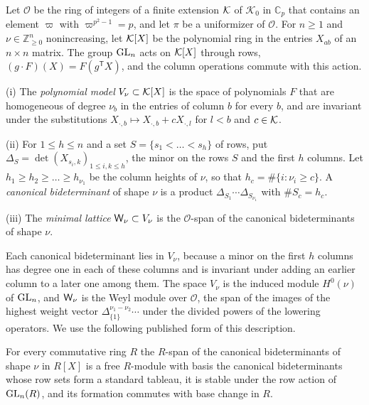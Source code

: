 Let $\mathcal O$ be the ring of integers of a finite extension $\mathcal K$ of $\mathcal K_0$ in $\mathbb C_p$ that contains an element $\varpi$ with $\varpi^{p^2-1}=p$, and let $\pi$ be a uniformizer of $\mathcal O$. For $n\ge1$ and $\nu\in\mathbb Z^n_{\ge0}$ nonincreasing, let $\mathcal K[X]$ be the polynomial ring in the entries $X_{ab}$ of an $n\times n$ matrix. The group $\operatorname{GL}_n$ acts on $\mathcal K[X]$ through rows, $(g\cdot F)(X)=F(g^{\mathsf T}X)$, and the column operations commute with this action.

\begin{definition}\label{r1:def:models}
(i) The \emph{polynomial model} $V_\nu\subset\mathcal K[X]$ is the space of polynomials $F$ that are homogeneous of degree $\nu_b$ in the entries of column $b$ for every $b$, and are invariant under the substitutions $X_{\cdot,b}\mapsto X_{\cdot,b}+cX_{\cdot,l}$ for $l<b$ and $c\in\mathcal K$.

(ii) For $1\le h\le n$ and a set $S=\{s_1<\dots<s_h\}$ of rows, put $\Delta_S=\det(X_{s_i,k})_{1\le i,k\le h}$, the minor on the rows $S$ and the first $h$ columns. Let $h_1\ge h_2\ge\dots\ge h_{\nu_1}$ be the column heights of $\nu$, so that $h_c=\#\{i:\nu_i\ge c\}$. A \emph{canonical bideterminant} of shape $\nu$ is a product $\Delta_{S_1}\cdots\Delta_{S_{\nu_1}}$ with $\#S_c=h_c$.

(iii) The \emph{minimal lattice} $\mathsf W_\nu\subset V_\nu$ is the $\mathcal O$-span of the canonical bideterminants of shape $\nu$.
\end{definition}

Each canonical bideterminant lies in $V_\nu$, because a minor on the first $h$ columns has degree one in each of these columns and is invariant under adding an earlier column to a later one among them. The space $V_\nu$ is the induced module $H^0(\nu)$ of $\operatorname{GL}_n$, and $\mathsf W_\nu$ is the Weyl module over $\mathcal O$, the span of the images of the highest weight vector $\Delta_{\{1\}}^{\nu_1-\nu_2}\cdots$ under the divided powers of the lowering operators. We use the following published form of this description.

\begin{theorem}\label{r1:thm:bidet}
For every commutative ring $R$ the $R$-span of the canonical bideterminants of shape $\nu$ in $R[X]$ is a free $R$-module with basis the canonical bideterminants whose row sets form a standard tableau, it is stable under the row action of $\operatorname{GL}_n(R)$, and its formation commutes with base change in $R$.
\end{theorem}

